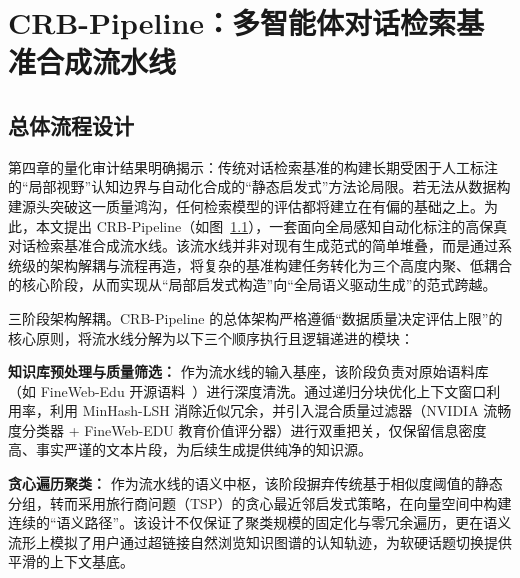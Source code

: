 \chapter{CRB-Pipeline：多智能体对话检索基准合成流水线}









\section{总体流程设计}

\label{sec:pipeline_overview}



第四章的量化审计结果明确揭示：传统对话检索基准的构建长期受困于人工标注的“局部视野”认知边界与自动化合成的“静态启发式”方法论局限。若无法从数据构建源头突破这一质量鸿沟，任何检索模型的评估都将建立在有偏的基础之上。为此，本文提出 CRB-Pipeline（如图~\ref{fig:crb-pipeline-framework}），一套面向全局感知自动化标注的高保真对话检索基准合成流水线。该流水线并非对现有生成范式的简单堆叠，而是通过系统级的架构解耦与流程再造，将复杂的基准构建任务转化为三个高度内聚、低耦合的核心阶段，从而实现从“局部启发式构造”向“全局语义驱动生成”的范式跨越。


\begin{figure}[h]

    \centering



    \label{fig:crb-pipeline-framework}

\end{figure}


三阶段架构解耦。CRB-Pipeline 的总体架构严格遵循“数据质量决定评估上限”的核心原则，将流水线分解为以下三个顺序执行且逻辑递进的模块：

\textbf{知识库预处理与质量筛选：} 作为流水线的输入基座，该阶段负责对原始语料库（如 FineWeb-Edu 开源语料~\citep{penedo2024finewebedufineweb}）进行深度清洗。通过递归分块优化上下文窗口利用率，利用 MinHash-LSH 消除近似冗余，并引入混合质量过滤器（NVIDIA 流畅度分类器 + FineWeb-EDU 教育价值评分器）进行双重把关，仅保留信息密度高、事实严谨的文本片段，为后续生成提供纯净的知识源。

\textbf{贪心遍历聚类：} 作为流水线的语义中枢，该阶段摒弃传统基于相似度阈值的静态分组，转而采用旅行商问题（TSP）的贪心最近邻启发式策略，在向量空间中构建连续的“语义路径”。该设计不仅保证了聚类规模的固定化与零冗余遍历，更在语义流形上模拟了用户通过超链接自然浏览知识图谱的认知轨迹，为软硬话题切换提供平滑的上下文基底。


